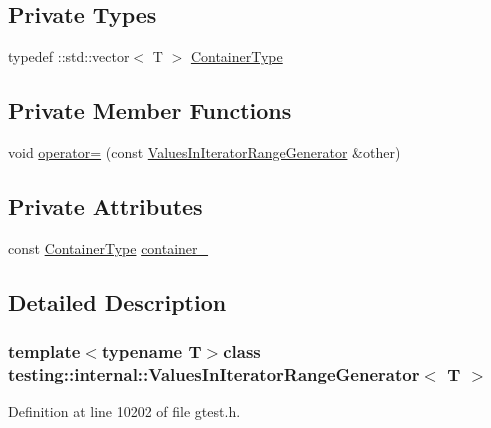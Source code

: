 \subsection*{\-Private \-Types}
\begin{DoxyCompactItemize}
\item 
typedef \-::std\-::vector$<$ \-T $>$ \hyperlink{classtesting_1_1internal_1_1ValuesInIteratorRangeGenerator_a88dbab22617aea101d1f0c822dc72f14}{\-Container\-Type}
\end{DoxyCompactItemize}
\subsection*{\-Private \-Member \-Functions}
\begin{DoxyCompactItemize}
\item 
void \hyperlink{classtesting_1_1internal_1_1ValuesInIteratorRangeGenerator_a305eceb17f2cf9ac59bd51602e709e1e}{operator=} (const \hyperlink{classtesting_1_1internal_1_1ValuesInIteratorRangeGenerator}{\-Values\-In\-Iterator\-Range\-Generator} \&other)
\end{DoxyCompactItemize}
\subsection*{\-Private \-Attributes}
\begin{DoxyCompactItemize}
\item 
const \hyperlink{classtesting_1_1internal_1_1ValuesInIteratorRangeGenerator_a88dbab22617aea101d1f0c822dc72f14}{\-Container\-Type} \hyperlink{classtesting_1_1internal_1_1ValuesInIteratorRangeGenerator_a79ef83271a99d7944d173568b277903f}{container\-\_\-}
\end{DoxyCompactItemize}


\subsection{\-Detailed \-Description}
\subsubsection*{template$<$typename T$>$class testing\-::internal\-::\-Values\-In\-Iterator\-Range\-Generator$<$ T $>$}



\-Definition at line 10202 of file gtest.\-h.



